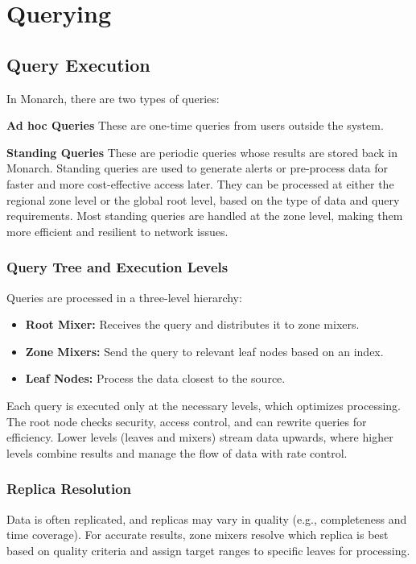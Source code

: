 \chapter{Querying}

\label{Chapter6} %


\section{Query Execution}

In Monarch, there are two types of queries:

\textbf{Ad hoc Queries}
These are one-time queries from users outside the system.

\textbf{Standing Queries}
These are periodic queries whose results are stored back in Monarch. Standing queries are used to generate alerts or pre-process data for faster and more cost-effective access later. They can be processed at either the regional zone level or the global root level, based on the type of data and query requirements. Most standing queries are handled at the zone level, making them more efficient and resilient to network issues.

\subsection{Query Tree and Execution Levels}
Queries are processed in a three-level hierarchy:
\begin{itemize}
    \item \textbf{Root Mixer:} Receives the query and distributes it to zone mixers.
    \item \textbf{Zone Mixers:} Send the query to relevant leaf nodes based on an index.
    \item \textbf{Leaf Nodes:} Process the data closest to the source.
\end{itemize}
Each query is executed only at the necessary levels, which optimizes processing. The root node checks security, access control, and can rewrite queries for efficiency. Lower levels (leaves and mixers) stream data upwards, where higher levels combine results and manage the flow of data with rate control.

\subsection{Replica Resolution}
Data is often replicated, and replicas may vary in quality (e.g., completeness and time coverage). For accurate results, zone mixers resolve which replica is best based on quality criteria and assign target ranges to specific leaves for processing.

